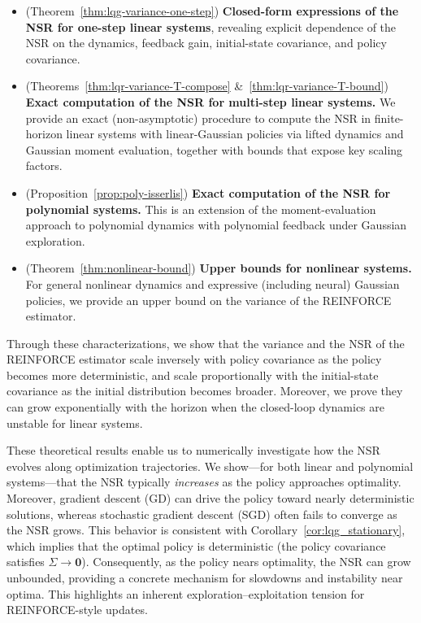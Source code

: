 \begin{itemize}
    \item (Theorem~\ref{thm:lqg-variance-one-step}) \textbf{Closed-form expressions of the NSR for one-step linear systems}, 
    revealing explicit dependence of the NSR on the dynamics, feedback gain, initial-state covariance, and policy covariance.
    \item (Theorems~\ref{thm:lqr-variance-T-compose} \&~\ref{thm:lqr-variance-T-bound}) \textbf{Exact computation of the NSR for multi-step linear systems.} We provide an exact (non-asymptotic) procedure to compute the NSR in finite-horizon linear systems with linear-Gaussian policies via lifted dynamics and Gaussian moment evaluation, together with bounds that expose key scaling factors.
    \item (Proposition~\ref{prop:poly-isserlis}) \textbf{Exact computation of the NSR for polynomial systems.}
    This is an extension of the moment-evaluation approach to polynomial dynamics with polynomial feedback under Gaussian exploration.
    \item (Theorem~\ref{thm:nonlinear-bound}) \textbf{Upper bounds for nonlinear systems.}
    For general nonlinear dynamics and expressive (including neural) Gaussian policies, we provide an upper bound on the variance of the REINFORCE estimator.
\end{itemize}

\vspace{-4mm} 
Through these characterizations, we show that the variance and the NSR of the REINFORCE estimator scale inversely with policy covariance as the policy becomes more deterministic, and scale proportionally with the initial-state covariance as the initial distribution becomes broader. Moreover, we prove they can grow exponentially with the horizon when the closed-loop dynamics are unstable for linear systems.

These theoretical results enable us to numerically investigate how the NSR evolves along optimization trajectories. We show---for both linear and polynomial systems---that the NSR typically \emph{increases} as the policy approaches optimality. Moreover, gradient descent (GD) can drive the policy toward nearly deterministic solutions, whereas stochastic gradient descent (SGD) often fails to converge as the NSR grows. This behavior is consistent with Corollary~\ref{cor:lqg_stationary}, which implies that the optimal policy is deterministic (\ie the policy covariance satisfies $\Sigma\to \mathbf{0}$). Consequently, as the policy nears optimality, the NSR can grow unbounded, providing a concrete mechanism for slowdowns and instability near optima. This highlights an inherent exploration--exploitation tension for REINFORCE-style updates.

